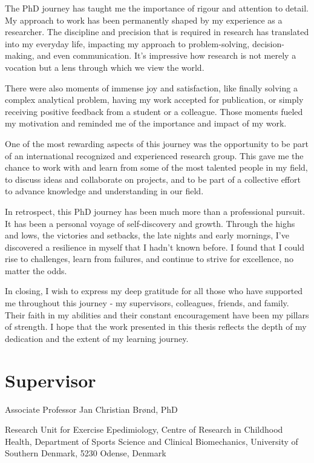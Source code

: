 \documentclass[
  10pt,
  letterpaper,
  DIV=11,
  numbers=noendperiod]{scrartcl}
\begin{document}
The PhD journey has taught me the importance of rigour and attention to
detail. My approach to work has been permanently shaped by my experience
as a researcher. The discipline and precision that is required in
research has translated into my everyday life, impacting my approach to
problem-solving, decision-making, and even communication. It's
impressive how research is not merely a vocation but a lens through
which we view the world.

There were also moments of immense joy and satisfaction, like finally
solving a complex analytical problem, having my work accepted for
publication, or simply receiving positive feedback from a student or a
colleague. Those moments fueled my motivation and reminded me of the
importance and impact of my work.

One of the most rewarding aspects of this journey was the opportunity to
be part of an international recognized and experienced research group.
This gave me the chance to work with and learn from some of the most
talented people in my field, to discuss ideas and collaborate on
projects, and to be part of a collective effort to advance knowledge and
understanding in our field.

In retrospect, this PhD journey has been much more than a professional
pursuit. It has been a personal voyage of self-discovery and growth.
Through the highs and lows, the victories and setbacks, the late nights
and early mornings, I've discovered a resilience in myself that I hadn't
known before. I found that I could rise to challenges, learn from
failures, and continue to strive for excellence, no matter the odds.

In closing, I wish to express my deep gratitude for all those who have
supported me throughout this journey - my supervisors, colleagues,
friends, and family. Their faith in my abilities and their constant
encouragement have been my pillars of strength. I hope that the work
presented in this thesis reflects the depth of my dedication and the
extent of my learning journey.

\newpage

\hypertarget{supervisor}{%
\section{Supervisor}\label{supervisor}}

Associate Professor Jan Christian Brønd, PhD

Research Unit for Exercise Epedimiology, Centre of Research in Childhood
Health, Department of Sports Science and Clinical Biomechanics,
University of Southern Denmark, 5230 Odense, Denmark
\end{document}
